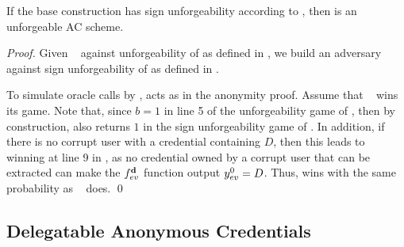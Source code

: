 \begin{theorem}
  If the base \CUASGen construction has sign unforgeability according to
  , then \CUASAC is an unforgeable AC scheme.
\end{theorem}

\begin{proof}
  Given \adv~ against unforgeability of \CUASAC as defined in \cite{fhs19}, we
  build an adversary \advB against sign unforgeability of \CUASGen as defined in
  .

  To simulate oracle calls by \adv, \advB acts as in the anonymity proof. Assume
  that \adv~ wins its game. Note that, since $b=1$ in line 5 of the
  unforgeability game of , then by construction, \Verify
  also returns $1$ in the sign unforgeability game of \UAS. In addition, if
  there is no corrupt user with a credential containing $D$, then this leads to
  \advB winning at line 9 in , as no credential
  owned by a corrupt user that can be extracted can make the $f_{ev}^{\mathbf{d}}$
  function output $y_{ev}^0=D$. Thus, \advB wins with the same probability as
  \adv~ does.  
  \qed
\end{proof}

\subsection{Delegatable Anonymous Credentials}
\label{sapp:related-models-dac}

